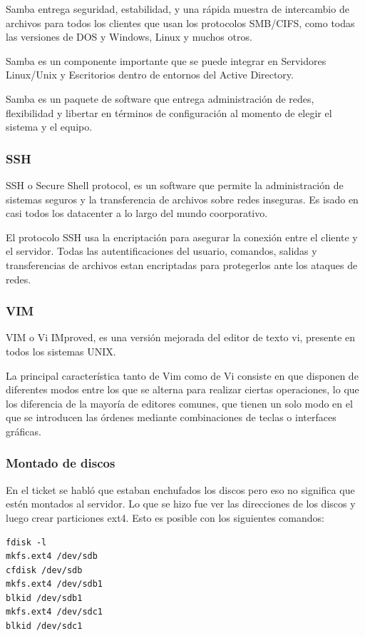 \documentclass[12pt,a4paper]{article}
\begin{document}
Samba entrega seguridad, estabilidad, y una rápida muestra de intercambio de archivos para todos los clientes que usan los protocolos SMB/CIFS, como todas las versiones de DOS y Windows, Linux y muchos otros.

Samba es un componente importante que se puede integrar en Servidores Linux/Unix y Escritorios dentro de entornos del Active Directory.

Samba es un paquete de software que entrega administración de redes, flexibilidad y libertar en términos de configuración al momento de elegir el sistema y el equipo.\cite{SAMBA}

\subsubsection{SSH}
SSH o Secure Shell protocol, es un software que permite la administración de sistemas seguros y la transferencia de archivos sobre redes inseguras. Es isado en casi todos los datacenter a lo largo del mundo coorporativo.

El protocolo SSH usa la encriptación para asegurar la conexión entre el cliente y el servidor. Todas las autentificaciones del usuario, comandos, salidas y transferencias de archivos estan encriptadas para protegerlos ante los ataques de redes. \cite{SSH}

\subsubsection{VIM}
VIM o Vi IMproved, es una versión mejorada del editor de texto vi, presente en todos los sistemas UNIX.

La principal característica tanto de Vim como de Vi consiste en que disponen de diferentes modos entre los que se alterna para realizar ciertas operaciones, lo que los diferencia de la mayoría de editores comunes, que tienen un solo modo en el que se introducen las órdenes mediante combinaciones de teclas o interfaces gráficas. \cite{VIM}

\subsubsection{Montado de discos}
En el ticket se habló que estaban enchufados los discos pero eso no significa que estén montados al servidor. Lo que se hizo fue ver las direcciones de los discos y luego crear particiones ext4. Esto es posible con los siguientes comandos:

\begin{lstlisting}
fdisk -l
mkfs.ext4 /dev/sdb 
cfdisk /dev/sdb 
mkfs.ext4 /dev/sdb1 
blkid /dev/sdb1  
mkfs.ext4 /dev/sdc1 
blkid /dev/sdc1
\end{lstlisting}
\end{document}

